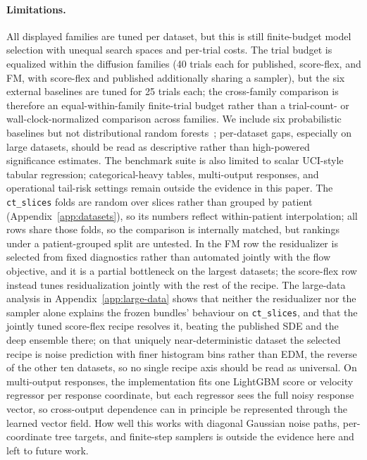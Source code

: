 \documentclass{article}
\begin{document}
\paragraph{Limitations.} All displayed families are tuned per dataset, but this is still finite-budget model selection with unequal search spaces and per-trial costs. The trial budget is equalized within the diffusion families (40 trials each for published, score-flex, and FM, with score-flex and published additionally sharing a sampler), but the six external baselines are tuned for 25 trials each; the cross-family comparison is therefore an equal-within-family finite-trial budget rather than a trial-count- or wall-clock-normalized comparison across families. We include six probabilistic baselines but not distributional random forests~\citep{cevid2022drf}; per-dataset gaps, especially on large datasets, should be read as descriptive rather than high-powered significance estimates. The benchmark suite is also limited to scalar UCI-style tabular regression; categorical-heavy tables, multi-output responses, and operational tail-risk settings remain outside the evidence in this paper. The \texttt{ct\_slices} folds are random over slices rather than grouped by patient (Appendix~\ref{app:datasets}), so its numbers reflect within-patient interpolation; all rows share those folds, so the comparison is internally matched, but rankings under a patient-grouped split are untested. In the FM row the residualizer is selected from fixed diagnostics rather than automated jointly with the flow objective, and it is a partial bottleneck on the largest datasets; the score-flex row instead tunes residualization jointly with the rest of the recipe. The large-data analysis in Appendix~\ref{app:large-data} shows that neither the residualizer nor the sampler alone explains the frozen bundles' behaviour on \texttt{ct\_slices}, and that the jointly tuned score-flex recipe resolves it, beating the published SDE and the deep ensemble there; on that uniquely near-deterministic dataset the selected recipe is noise prediction with finer histogram bins rather than EDM, the reverse of the other ten datasets, so no single recipe axis should be read as universal. On multi-output responses, the implementation fits one LightGBM score or velocity regressor per response coordinate, but each regressor sees the full noisy response vector, so cross-output dependence can in principle be represented through the learned vector field. How well this works with diagonal Gaussian noise paths, per-coordinate tree targets, and finite-step samplers is outside the evidence here and left to future work.
\end{document}

